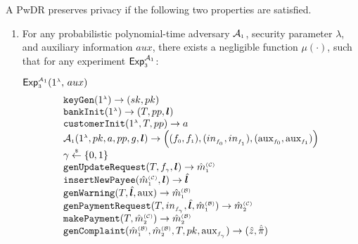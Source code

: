 



\begin{definition}[Privacy]\label{def::privacy} A PwDR preserves privacy if  the following two properties are satisfied.
\begin{enumerate}

\item For any probabilistic polynomial-time  adversary $\mathcal{A}_{\scriptscriptstyle 1}$,  security parameter $\lambda$, and  auxiliary information $aux$, there exists a negligible function $\mu(\cdot)$, such that for any  experiment $\mathsf{Exp}_{\scriptscriptstyle 3}^{\mathcal{A}_{\scriptscriptstyle 1}}$:



\begin{center}
\begin{mybox}[colback=white,  width=85mm, height=76mm,]{$\mathsf{Exp}_{\st 3}^{\st\mathcal{A}_{\st 1}}(1^{\st\lambda}\text{, }  {aux})$}
\vspace{-1.2mm}
$$
  \begin{array}{l}
%
 \mathtt{keyGen}(1^{\st\lambda})\rightarrow (sk,pk)\\
%
  \mathtt{bankInit}(1^{\st \lambda})\rightarrow (T, pp, \bm{l})\\
%
\mathtt{customerInit} (1^{\st \lambda}, T, pp)\rightarrow a\\
%
\mathcal{A}_{\st 1}(1^{\st \lambda}, pk, a, pp, g, \bm{l})\rightarrow \Big((f_{\st 0}, f_{\st 1}),(in_{\st f_{\st_{\st 0}}},in_{\st f_{\st _1}}),(\text{aux}_{\st f_{0}},\text{aux}_{\st f_{\st1}})\Big)\\
%
\gamma\stackrel{\st \$}\leftarrow\{0,1\}\\
%
\mathtt{genUpdateRequest}(T, f_{\st \gamma}, {\bm l})\rightarrow \hat m^{\st\mathcal{(C)}}_{\st 1}\\
%
\mathtt{insertNewPayee}(\hat{m}^{\st\mathcal{(C)}}_{\st 1}, {\bm l})\rightarrow  \hat{\bm l}\\
%
\mathtt{genWarning}(T, \hat{\bm l}, \text{aux})\rightarrow \hat m^{\st\mathcal{(B)}}_{\st1}\\
%
\mathtt{genPaymentRequest}(T, in_{\st f_{_\gamma}}, \hat{\bm{l}}, \hat m^{\st\mathcal{(B)}}_{\st1})\rightarrow \hat m^{\st\mathcal{(C)}}_{\st2}\\
%
\mathtt{makePayment}(T, \hat m^{\st\mathcal{(C)}}_{\st2})\rightarrow \hat m^{\st\mathcal{(B)}}_{\st2}\\
%
\mathtt{genComplaint}(\hat m^{\st\mathcal{(B)}}_{\st 1}, \hat m^{\st\mathcal{(B)}}_{\st2}, T, pk, \text{aux}_{\st f_{_\gamma}})\rightarrow (\hat z, \hat{\ddot \pi})\\

\end{array}$$
\end{mybox}
\end{center}
\end{enumerate}
\end{definition}
